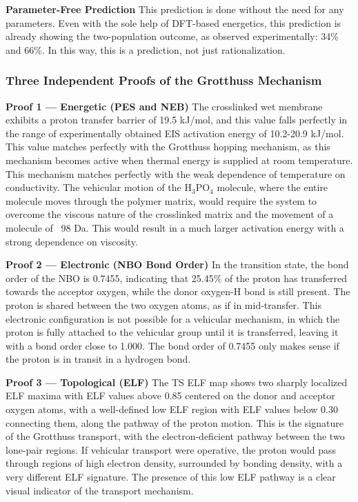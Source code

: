 \documentclass[12pt,a4paper]{report}
\begin{document}
\textbf{Parameter-Free Prediction}
This prediction is done without the need for any parameters. Even with the sole help of DFT-based energetics, this prediction is already showing the two-population outcome, as observed experimentally: 34\% and 66\%. In this way, this is a prediction, not just rationalization. \cite{63, 64, 100}

\subsubsection{Three Independent Proofs of the Grotthuss Mechanism}

\textbf{Proof 1 — Energetic (PES and NEB)}
The crosslinked wet membrane exhibits a proton transfer barrier of 19.5 kJ/mol, and this value falls perfectly in the range of experimentally obtained EIS activation energy of 10.2-20.9 kJ/mol.\cite{65, 66, 89,90,91} This value matches perfectly with the Grotthuss hopping mechanism, as this mechanism becomes active when thermal energy is supplied at room temperature. This mechanism matches perfectly with the weak dependence of temperature on conductivity. The vehicular motion of the H\(_3\)PO\(_4\) molecule, where the entire molecule moves through the polymer matrix, would require the system to overcome the viscous nature of the crosslinked matrix and the movement of a molecule of ~98 Da. This would result in a much larger activation energy with a strong dependence on viscosity.

\textbf{Proof 2 — Electronic (NBO Bond Order)}
In the transition state, the bond order of the NBO is 0.7455, indicating that 25.45\% of the proton has transferred towards the acceptor oxygen, while the donor oxygen-H bond is still present.\cite{84,85} The proton is shared between the two oxygen atoms, as if in mid-transfer. This electronic configuration is not possible for a vehicular mechanism, in which the proton is fully attached to the vehicular group until it is transferred, leaving it with a bond order close to 1.000. The bond order of 0.7455 only makes sense if the proton is in transit in a hydrogen bond.

\textbf{Proof 3 — Topological (ELF)}
The TS ELF map shows two sharply localized ELF maxima with ELF values above 0.85 centered on the donor and acceptor oxygen atoms, with a well-defined low ELF region with ELF values below 0.30 connecting them, along the pathway of the proton motion. This is the signature of the Grotthuss transport, with the electron-deficient pathway between the two lone-pair regions. If vehicular transport were operative, the proton would pass through regions of high electron density, surrounded by bonding density, with a very different ELF signature. The presence of this low ELF pathway is a clear visual indicator of the transport mechanism.
\end{document}

